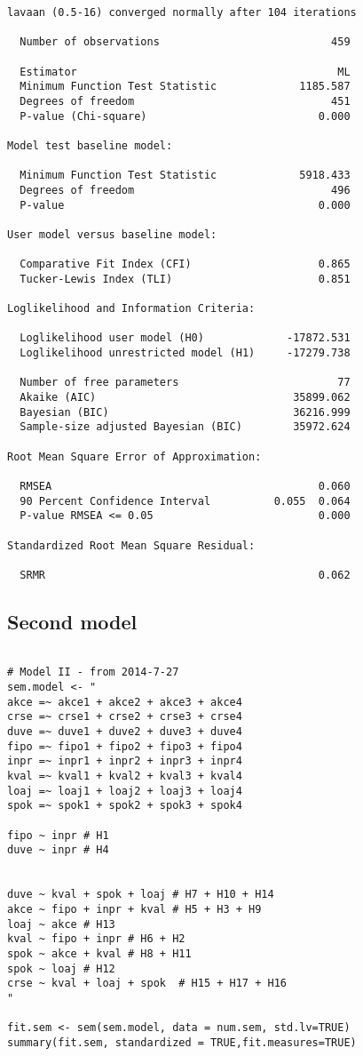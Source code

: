 \documentclass[10pt,a4paper]{article}
\begin{document}
\begin{verbatim}
lavaan (0.5-16) converged normally after 104 iterations

  Number of observations                           459

  Estimator                                         ML
  Minimum Function Test Statistic             1185.587
  Degrees of freedom                               451
  P-value (Chi-square)                           0.000

Model test baseline model:

  Minimum Function Test Statistic             5918.433
  Degrees of freedom                               496
  P-value                                        0.000

User model versus baseline model:

  Comparative Fit Index (CFI)                    0.865
  Tucker-Lewis Index (TLI)                       0.851

Loglikelihood and Information Criteria:

  Loglikelihood user model (H0)             -17872.531
  Loglikelihood unrestricted model (H1)     -17279.738

  Number of free parameters                         77
  Akaike (AIC)                               35899.062
  Bayesian (BIC)                             36216.999
  Sample-size adjusted Bayesian (BIC)        35972.624

Root Mean Square Error of Approximation:

  RMSEA                                          0.060
  90 Percent Confidence Interval          0.055  0.064
  P-value RMSEA <= 0.05                          0.000

Standardized Root Mean Square Residual:

  SRMR                                           0.062
\end{verbatim}

\subsection{Second model}

\begin{lstlisting}

# Model II - from 2014-7-27
sem.model <- "
akce =~ akce1 + akce2 + akce3 + akce4
crse =~ crse1 + crse2 + crse3 + crse4
duve =~ duve1 + duve2 + duve3 + duve4
fipo =~ fipo1 + fipo2 + fipo3 + fipo4
inpr =~ inpr1 + inpr2 + inpr3 + inpr4
kval =~ kval1 + kval2 + kval3 + kval4
loaj =~ loaj1 + loaj2 + loaj3 + loaj4
spok =~ spok1 + spok2 + spok3 + spok4

fipo ~ inpr # H1
duve ~ inpr # H4


duve ~ kval + spok + loaj # H7 + H10 + H14
akce ~ fipo + inpr + kval # H5 + H3 + H9
loaj ~ akce # H13
kval ~ fipo + inpr # H6 + H2
spok ~ akce + kval # H8 + H11
spok ~ loaj # H12
crse ~ kval + loaj + spok  # H15 + H17 + H16
"

fit.sem <- sem(sem.model, data = num.sem, std.lv=TRUE)
summary(fit.sem, standardized = TRUE,fit.measures=TRUE)
\end{lstlisting}
\end{document}
